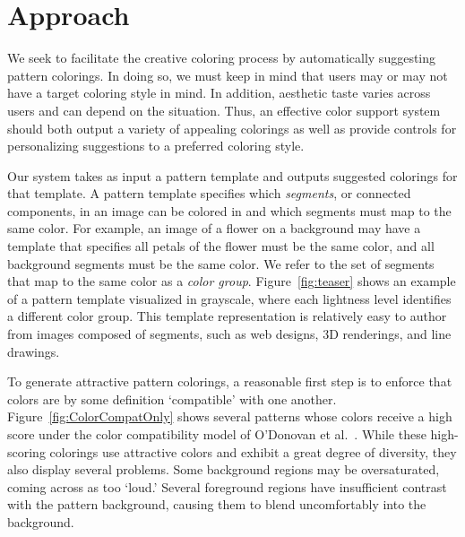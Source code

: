 \section{Approach}
\label{sec:approach}

We seek to facilitate the creative coloring process by automatically suggesting pattern colorings. In doing so, we must keep in mind that users may or may not have a target coloring style in mind. In addition, aesthetic taste varies across users and can depend on the situation. Thus, an effective color support system should both output a variety of appealing colorings as well as provide controls for personalizing suggestions to a preferred coloring style.

Our system takes as input a pattern template and outputs suggested colorings for that template. A pattern template specifies which \emph{segments}, or connected components, in an image can be colored in and which segments must map to the same color. For example, an image of a flower on a background may have a template that specifies all petals of the flower must be the same color, and all background segments must be the same color. We refer to the set of segments that map to the same color as a \emph{color group}. Figure~\ref{fig:teaser} shows an example of a pattern template visualized in grayscale, where each lightness level identifies a different color group. This template representation is relatively easy to author from images composed of segments, such as web designs, 3D renderings, and line drawings.

To generate attractive pattern colorings, a reasonable first step is to enforce that colors are by some definition `compatible' with one another. Figure~\ref{fig:ColorCompatOnly} shows several patterns whose colors receive a high score under the color compatibility model of O'Donovan et al.~. While these high-scoring colorings use attractive colors and exhibit a great degree of diversity, they also display several problems. Some background regions may be oversaturated, coming across as too `loud.' Several foreground regions have insufficient contrast with the pattern background, causing them to blend uncomfortably into the background.

